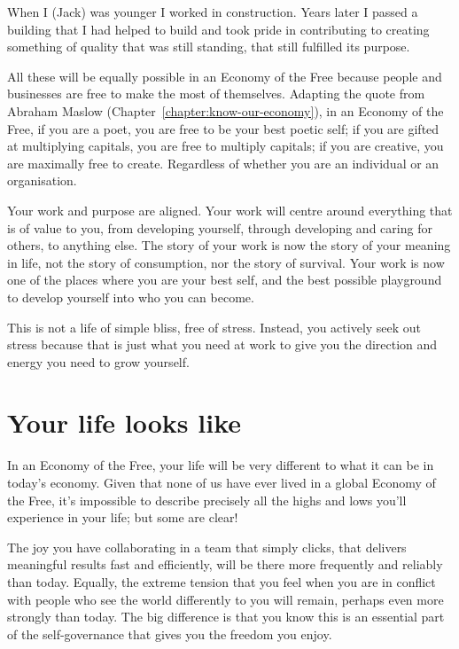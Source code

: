 \begin{longstoryblock}
When I (Jack) was younger I worked in construction. Years later I passed a building that I had helped to build and took pride in contributing to creating something of quality that was still standing, that still fulfilled its purpose. 
\end{longstoryblock}


All these will be equally possible in an Economy of the Free  because people and businesses are free to make the most of themselves. Adapting the quote from Abraham Maslow  (Chapter~\ref{chapter:know-our-economy}), in an Economy of the Free, if you are a poet, you are free to be your best poetic self; if you are gifted at multiplying capitals, you are free to multiply capitals; if you are creative, you are maximally free to create. Regardless of whether you are an individual or an organisation. 


Your work and purpose are aligned. Your work will centre around everything that is of value to you, from developing yourself, through developing and caring for others, to anything else. The story of your work is now the story of your meaning in life, not the story of consumption, nor the story of survival. Your work is now one of the places where you are your best self, and the best possible playground to develop yourself into who you can become.


This is not a life of simple bliss, free of stress. Instead, you actively seek out stress because that is just what you need at work to give you the direction and energy you need to grow yourself. 
\section{Your life looks like}
In an Economy of the Free, your life will be very different to what it can be in today's economy. Given that none of us have ever lived in a global Economy of the Free, it's impossible to describe precisely all the highs and lows you’ll experience in your life; but some are clear! 


The joy you have collaborating in a team that simply clicks, that delivers meaningful results fast and efficiently, will be there more frequently and reliably than today. Equally, the extreme tension that you feel when you are in conflict with people who see the world differently to you will remain, perhaps even more strongly than today. The big difference is that you know this is an essential part of the self-governance that gives you the freedom you enjoy.


